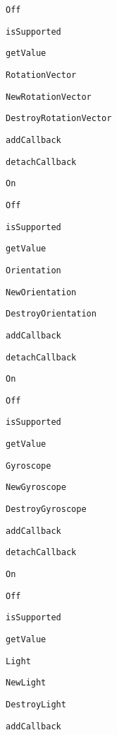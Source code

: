 \begin{DoxyItemize}
\begin{DoxyItemize}
\item {\tt Off}
\item {\tt is\-Supported}
\item {\tt get\-Value}
\end{DoxyItemize}
\item {\tt Rotation\-Vector}
\begin{DoxyItemize}
\item {\tt New\-Rotation\-Vector}
\item {\tt Destroy\-Rotation\-Vector}
\item {\tt add\-Callback}
\item {\tt detach\-Callback}
\item {\tt On}
\item {\tt Off}
\item {\tt is\-Supported}
\item {\tt get\-Value}
\end{DoxyItemize}
\item {\tt Orientation}
\begin{DoxyItemize}
\item {\tt New\-Orientation}
\item {\tt Destroy\-Orientation}
\item {\tt add\-Callback}
\item {\tt detach\-Callback}
\item {\tt On}
\item {\tt Off}
\item {\tt is\-Supported}
\item {\tt get\-Value}
\end{DoxyItemize}
\item {\tt Gyroscope}
\begin{DoxyItemize}
\item {\tt New\-Gyroscope}
\item {\tt Destroy\-Gyroscope}
\item {\tt add\-Callback}
\item {\tt detach\-Callback}
\item {\tt On}
\item {\tt Off}
\item {\tt is\-Supported}
\item {\tt get\-Value}
\end{DoxyItemize}
\item {\tt Light}
\begin{DoxyItemize}
\item {\tt New\-Light}
\item {\tt Destroy\-Light}
\item {\tt add\-Callback}

\end{DoxyItemize}
\end{DoxyItemize}

